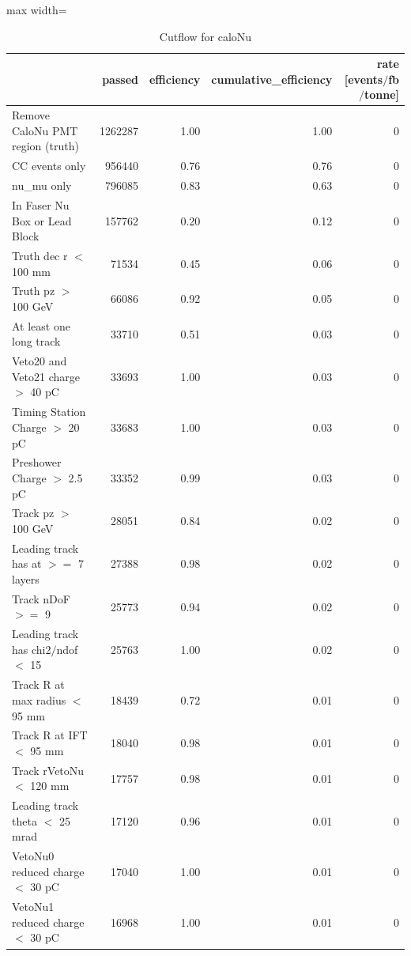 \documentclass{article}
\begin{document}
\begin{table}
\centering
\caption{Cutflow for caloNu}
\begin{adjustbox}{max width=\textwidth}
\begin{tabular}{lrrrr}
\toprule
 & passed & efficiency & cumulative\_efficiency & rate [events$/$fb$/$tonne] \\
\midrule
Remove CaloNu PMT region (truth) & 1262287 & 1.00 & 1.00 & 0 \\
CC events only & 956440 & 0.76 & 0.76 & 0 \\
nu\_mu only & 796085 & 0.83 & 0.63 & 0 \\
In Faser Nu Box or Lead Block & 157762 & 0.20 & 0.12 & 0 \\
Truth dec r $<$ 100 mm & 71534 & 0.45 & 0.06 & 0 \\
Truth pz $>$ 100 GeV & 66086 & 0.92 & 0.05 & 0 \\
At least one long track & 33710 & 0.51 & 0.03 & 0 \\
Veto20 and Veto21 charge $>$ 40 pC & 33693 & 1.00 & 0.03 & 0 \\
Timing Station Charge $>$ 20 pC & 33683 & 1.00 & 0.03 & 0 \\
Preshower Charge $>$ 2.5 pC & 33352 & 0.99 & 0.03 & 0 \\
Track pz $>$ 100 GeV & 28051 & 0.84 & 0.02 & 0 \\
Leading track has at $>$$=$ 7 layers & 27388 & 0.98 & 0.02 & 0 \\
Track nDoF $>$$=$ 9 & 25773 & 0.94 & 0.02 & 0 \\
Leading track has chi2$/$ndof $<$ 15 & 25763 & 1.00 & 0.02 & 0 \\
Track R at max radius $<$ 95 mm & 18439 & 0.72 & 0.01 & 0 \\
Track R at IFT $<$ 95 mm & 18040 & 0.98 & 0.01 & 0 \\
Track rVetoNu $<$ 120 mm & 17757 & 0.98 & 0.01 & 0 \\
Leading track theta $<$ 25 mrad & 17120 & 0.96 & 0.01 & 0 \\
VetoNu0 reduced charge $<$ 30 pC & 17040 & 1.00 & 0.01 & 0 \\
VetoNu1 reduced charge $<$ 30 pC & 16968 & 1.00 & 0.01 & 0 \\
\bottomrule
\end{tabular}

\end{adjustbox}
\end{table}
\end{document}
